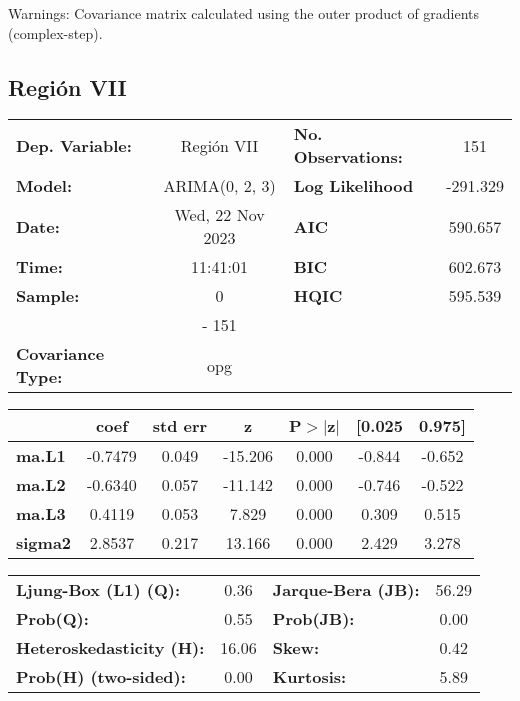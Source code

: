 \documentclass{article}%
\begin{document}
Warnings: \newline
 [1] Covariance matrix calculated using the outer product of gradients (complex-step).%
\subsection*{Región VII}%
\begin{center}
\begin{tabular}{lclc}
\toprule
\textbf{Dep. Variable:}          &    Región VII    & \textbf{  No. Observations:  } &    151      \\
\textbf{Model:}                  &  ARIMA(0, 2, 3)  & \textbf{  Log Likelihood     } &  -291.329   \\
\textbf{Date:}                   & Wed, 22 Nov 2023 & \textbf{  AIC                } &  590.657    \\
\textbf{Time:}                   &     11:41:01     & \textbf{  BIC                } &  602.673    \\
\textbf{Sample:}                 &        0         & \textbf{  HQIC               } &  595.539    \\
\textbf{}                        &       - 151      & \textbf{                     } &             \\
\textbf{Covariance Type:}        &       opg        & \textbf{                     } &             \\
\bottomrule
\end{tabular}
\begin{tabular}{lcccccc}
                & \textbf{coef} & \textbf{std err} & \textbf{z} & \textbf{P$> |$z$|$} & \textbf{[0.025} & \textbf{0.975]}  \\
\midrule
\textbf{ma.L1}  &      -0.7479  &        0.049     &   -15.206  &         0.000        &       -0.844    &       -0.652     \\
\textbf{ma.L2}  &      -0.6340  &        0.057     &   -11.142  &         0.000        &       -0.746    &       -0.522     \\
\textbf{ma.L3}  &       0.4119  &        0.053     &     7.829  &         0.000        &        0.309    &        0.515     \\
\textbf{sigma2} &       2.8537  &        0.217     &    13.166  &         0.000        &        2.429    &        3.278     \\
\bottomrule
\end{tabular}
\begin{tabular}{lclc}
\textbf{Ljung-Box (L1) (Q):}     &  0.36 & \textbf{  Jarque-Bera (JB):  } & 56.29  \\
\textbf{Prob(Q):}                &  0.55 & \textbf{  Prob(JB):          } &  0.00  \\
\textbf{Heteroskedasticity (H):} & 16.06 & \textbf{  Skew:              } &  0.42  \\
\textbf{Prob(H) (two-sided):}    &  0.00 & \textbf{  Kurtosis:          } &  5.89  \\
\bottomrule
\end{tabular}
\end{center}
\end{document}
